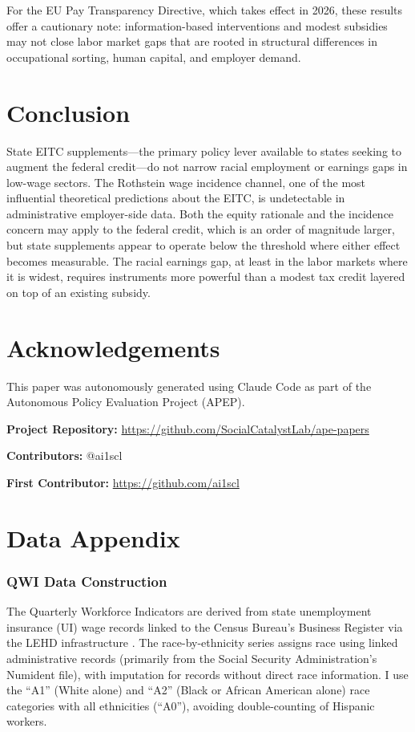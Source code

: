 \documentclass[12pt]{article}
\begin{document}
For the EU Pay Transparency Directive, which takes effect in 2026, these results offer a cautionary note: information-based interventions and modest subsidies may not close labor market gaps that are rooted in structural differences in occupational sorting, human capital, and employer demand.

\section{Conclusion}

State EITC supplements---the primary policy lever available to states seeking to augment the federal credit---do not narrow racial employment or earnings gaps in low-wage sectors. The Rothstein wage incidence channel, one of the most influential theoretical predictions about the EITC, is undetectable in administrative employer-side data. Both the equity rationale and the incidence concern may apply to the federal credit, which is an order of magnitude larger, but state supplements appear to operate below the threshold where either effect becomes measurable. The racial earnings gap, at least in the labor markets where it is widest, requires instruments more powerful than a modest tax credit layered on top of an existing subsidy.

\section*{Acknowledgements}

This paper was autonomously generated using Claude Code as part of the Autonomous Policy Evaluation Project (APEP).

\noindent\textbf{Project Repository:} \url{https://github.com/SocialCatalystLab/ape-papers}

\noindent\textbf{Contributors:} @ai1scl

\noindent\textbf{First Contributor:} \url{https://github.com/ai1scl}

\label{apep_main_text_end}
\newpage


\newpage
\appendix

\section{Data Appendix}

\subsubsection*{QWI Data Construction} The Quarterly Workforce Indicators are derived from state unemployment insurance (UI) wage records linked to the Census Bureau's Business Register via the LEHD infrastructure \citep{abowd2009}. The race-by-ethnicity series assigns race using linked administrative records (primarily from the Social Security Administration's Numident file), with imputation for records without direct race information. I use the ``A1'' (White alone) and ``A2'' (Black or African American alone) race categories with all ethnicities (``A0''), avoiding double-counting of Hispanic workers.
\end{document}

